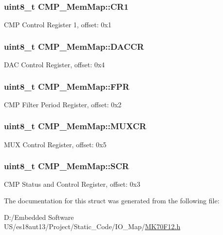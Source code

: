 \subsubsection[{C\+R1}]{\setlength{\rightskip}{0pt plus 5cm}uint8\+\_\+t C\+M\+P\+\_\+\+Mem\+Map\+::\+C\+R1}\label{struct_c_m_p___mem_map_ab790f5d18ef53ba0c9cfc2b5f3ce6668}
C\+M\+P Control Register 1, offset\+: 0x1 \hypertarget{struct_c_m_p___mem_map_a64ad86546fe53058b6fdd5ca1252f7c2}{}
\subsubsection[{D\+A\+C\+C\+R}]{\setlength{\rightskip}{0pt plus 5cm}uint8\+\_\+t C\+M\+P\+\_\+\+Mem\+Map\+::\+D\+A\+C\+C\+R}\label{struct_c_m_p___mem_map_a64ad86546fe53058b6fdd5ca1252f7c2}
D\+A\+C Control Register, offset\+: 0x4 \hypertarget{struct_c_m_p___mem_map_aa793447f43fa77759b6eaf1620bed4bc}{}
\subsubsection[{F\+P\+R}]{\setlength{\rightskip}{0pt plus 5cm}uint8\+\_\+t C\+M\+P\+\_\+\+Mem\+Map\+::\+F\+P\+R}\label{struct_c_m_p___mem_map_aa793447f43fa77759b6eaf1620bed4bc}
C\+M\+P Filter Period Register, offset\+: 0x2 \hypertarget{struct_c_m_p___mem_map_a3b48de300c4b4116ebb942659a2948a2}{}
\subsubsection[{M\+U\+X\+C\+R}]{\setlength{\rightskip}{0pt plus 5cm}uint8\+\_\+t C\+M\+P\+\_\+\+Mem\+Map\+::\+M\+U\+X\+C\+R}\label{struct_c_m_p___mem_map_a3b48de300c4b4116ebb942659a2948a2}
M\+U\+X Control Register, offset\+: 0x5 \hypertarget{struct_c_m_p___mem_map_a3fe55f0243869b50fc54acb9c194d970}{}
\subsubsection[{S\+C\+R}]{\setlength{\rightskip}{0pt plus 5cm}uint8\+\_\+t C\+M\+P\+\_\+\+Mem\+Map\+::\+S\+C\+R}\label{struct_c_m_p___mem_map_a3fe55f0243869b50fc54acb9c194d970}
C\+M\+P Status and Control Register, offset\+: 0x3 

The documentation for this struct was generated from the following file\+:\begin{DoxyCompactItemize}
\item 
D\+:/\+Embedded Software U\+S/es18aut13/\+Project/\+Static\+\_\+\+Code/\+I\+O\+\_\+\+Map/\hyperlink{_m_k70_f12_8h}{M\+K70\+F12.\+h}\end{DoxyCompactItemize}
